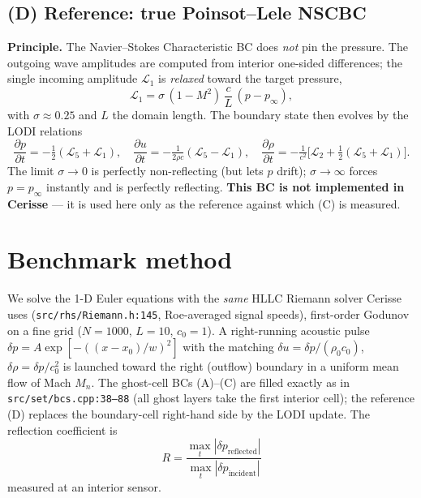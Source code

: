 \documentclass[11pt]{article}
\newcommand{\pinf}{p_\infty}
\begin{document}
\subsection{(D) Reference: true Poinsot--Lele NSCBC}
\textbf{Principle.} The Navier--Stokes Characteristic BC does \emph{not} pin the
pressure. The outgoing wave amplitudes are computed from interior one-sided
differences; the single incoming amplitude $\mathcal L_1$ is \emph{relaxed}
toward the target pressure,
\begin{equation}
\mathcal L_1 = \sigma\,(1-M^2)\,\frac{c}{L}\,(p-\pinf),
\label{eq:relax}
\end{equation}
with $\sigma\!\approx\!0.25$ and $L$ the domain length. The boundary state then
evolves by the LODI relations
\begin{equation}
\frac{\partial p}{\partial t}=-\tfrac12(\mathcal L_5+\mathcal L_1),\quad
\frac{\partial u}{\partial t}=-\tfrac{1}{2\rho c}(\mathcal L_5-\mathcal L_1),\quad
\frac{\partial \rho}{\partial t}=-\tfrac1{c^2}\!\big[\mathcal L_2+\tfrac12(\mathcal L_5+\mathcal L_1)\big].
\end{equation}
The limit $\sigma\!\to\!0$ is perfectly non-reflecting (but lets $p$ drift);
$\sigma\!\to\!\infty$ forces $p=\pinf$ instantly and is perfectly reflecting.
\textbf{This BC is not implemented in Cerisse} --- it is used here only as the
reference against which (C) is measured.

\section{Benchmark method}
We solve the 1-D Euler equations with the \emph{same} HLLC Riemann solver Cerisse
uses (\texttt{src/rhs/Riemann.h:145}, Roe-averaged signal speeds), first-order
Godunov on a fine grid ($N{=}1000$, $L{=}10$, $c_0{=}1$). A right-running
acoustic pulse $\delta p=A\exp[-((x-x_0)/w)^2]$ with the matching
$\delta u=\delta p/(\rho_0c_0)$, $\delta\rho=\delta p/c_0^2$ is launched toward
the right (outflow) boundary in a uniform mean flow of Mach $M_n$. The
ghost-cell BCs (A)--(C) are filled exactly as in \texttt{src/set/bcs.cpp:38--88}
(all ghost layers take the first interior cell); the reference (D) replaces the
boundary-cell right-hand side by the LODI update. The reflection coefficient is
\begin{equation}
R=\frac{\max_t|\delta p_{\text{reflected}}|}{\max_t|\delta p_{\text{incident}}|}
\end{equation}
measured at an interior sensor.
\end{document}

